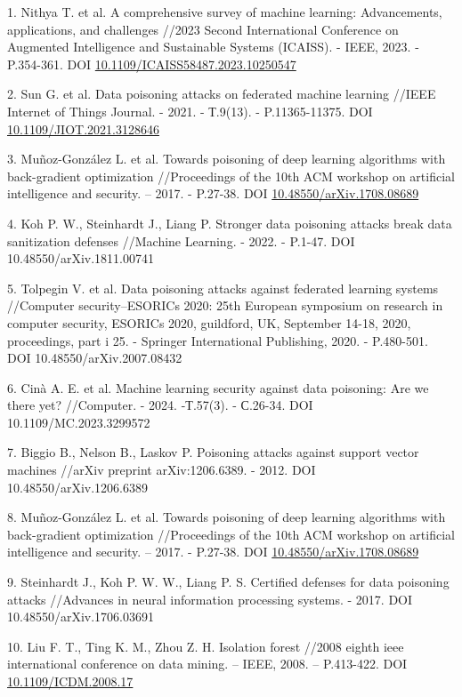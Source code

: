 \begin{references}
1. Nithya T. et al. A comprehensive survey of machine learning:
Advancements, applications, and challenges //2023 Second International
Conference on Augmented Intelligence and Sustainable Systems (ICAISS). -
IEEE, 2023. - P.354-361. DOI
\href{http://dx.doi.org/10.1109/ICAISS58487.2023.10250547}{10.1109/ICAISS58487.2023.10250547}

2. Sun G. et al. Data poisoning attacks on federated machine learning
//IEEE Internet of Things Journal. - 2021. - Т.9(13). - P.11365-11375.
DOI
\href{http://dx.doi.org/10.1109/JIOT.2021.3128646}{10.1109/JIOT.2021.3128646}

3. Muñoz-González L. et al. Towards poisoning of deep learning algorithms
with back-gradient optimization //Proceedings of the 10th ACM workshop
on artificial intelligence and security. -- 2017. - P.27-38. DOI
\href{http://dx.doi.org/10.48550/arXiv.1708.08689}{10.48550/arXiv.1708.08689}

4. Koh P. W., Steinhardt J., Liang P. Stronger data poisoning attacks
break data sanitization defenses //Machine Learning. - 2022. - P.1-47.
DOI 10.48550/arXiv.1811.00741

5. Tolpegin V. et al. Data poisoning attacks against federated learning
systems //Computer security--ESORICs 2020: 25th European symposium on
research in computer security, ESORICs 2020, guildford, UK, September
14-18, 2020, proceedings, part i 25. - Springer International
Publishing, 2020. - P.480-501. DOI 10.48550/arXiv.2007.08432

6. Cinà A. E. et al. Machine learning security against data poisoning:
Are we there yet? //Computer. - 2024. -Т.57(3). - С.26-34. DOI
10.1109/MC.2023.3299572

7. Biggio B., Nelson B., Laskov P. Poisoning attacks against support
vector machines //arXiv preprint arXiv:1206.6389. - 2012. DOI
10.48550/arXiv.1206.6389

8. Muñoz-González L. et al. Towards poisoning of deep learning algorithms
with back-gradient optimization //Proceedings of the 10th ACM workshop
on artificial intelligence and security. -- 2017. - P.27-38. DOI
\href{http://dx.doi.org/10.48550/arXiv.1708.08689}{10.48550/arXiv.1708.08689}

9. Steinhardt J., Koh P. W. W., Liang P. S. Certified defenses for data
poisoning attacks //Advances in neural information processing systems. -
2017. DOI 10.48550/arXiv.1706.03691

10. Liu F. T., Ting K. M., Zhou Z. H. Isolation forest //2008 eighth ieee
international conference on data mining. -- IEEE, 2008. -- P.413-422.
DOI \href{http://dx.doi.org/10.1109/ICDM.2008.17}{10.1109/ICDM.2008.17}


\end{references}
